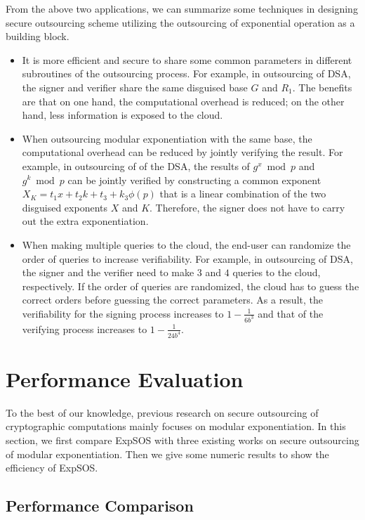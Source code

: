 \documentclass[english,draftcls,onecolumn,11pt]{IEEEtran}
\theoremstyle{definition}
\theoremstyle{plain}
\theoremstyle{plain}
\theoremstyle{definition}
\begin{document}
From the above two applications, we can summarize some techniques
in designing secure outsourcing scheme utilizing the outsourcing of
exponential operation as a building block.
\begin{itemize}
\item It is more efficient and secure to share some common parameters in
different subroutines of the outsourcing process. For example, in
outsourcing of DSA, the signer and verifier share the same disguised
base $G$ and $R_{1}$. The benefits are that on one hand, the computational
overhead is reduced; on the other hand, less information is exposed
to the cloud. 
\item When outsourcing modular exponentiation with the same base, the computational
overhead can be reduced by jointly verifying the result. For example,
in outsourcing of of the DSA, the results of $g^{x}\bmod p$ and $g^{k}\bmod p$
can be jointly verified by constructing a common exponent $X_{K}=t_{1}x+t_{2}k+t_{3}+k_{3}\phi(p)$
that is a linear combination of the two disguised exponents $X$ and
$K$. Therefore, the signer does not have to carry out the extra exponentiation.
\item When making multiple queries to the cloud, the end-user can randomize
the order of queries to increase verifiability. For example, in outsourcing
of DSA, the signer and the verifier need to make $3$ and $4$ queries
to the cloud, respectively. If the order of queries are randomized,
the cloud has to guess the correct orders before guessing the correct
parameters. As a result, the verifiability for the signing process
increases to $1-\frac{1}{6b^{3}}$ and that of the verifying process
increases to $1-\frac{1}{24b^{4}}$. 
\end{itemize}

\section{Performance Evaluation\label{sec:Performance-Comparison}}

To the best of our knowledge, previous research on secure outsourcing
of cryptographic computations mainly focuses on modular exponentiation.
In this section, we first compare ExpSOS with three existing works
on secure outsourcing of modular exponentiation. Then we give some
numeric results to show the efficiency of ExpSOS.


\subsection{Performance Comparison}
\end{document}
